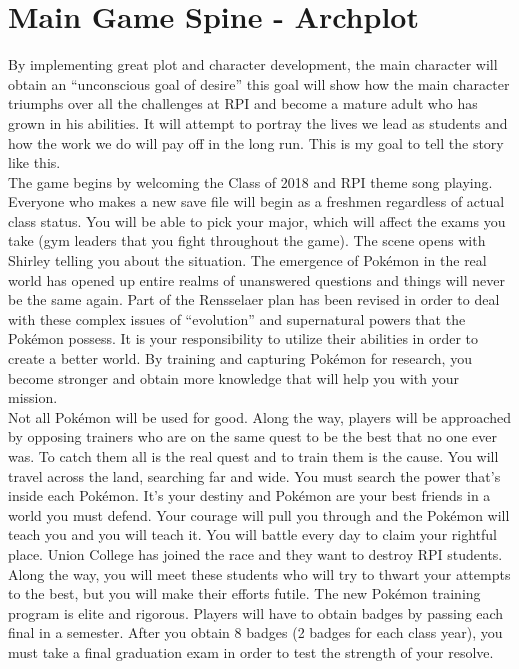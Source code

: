 \documentclass[11pt,fleqn]{book} %
\begin{document}
\vspace{1em}

\section{Main Game Spine - Archplot}
\vspace{1em}

\indent By implementing great plot and character development, the main character will obtain an “unconscious goal of desire” this goal will show how the main character triumphs over all the challenges at RPI and become a mature adult who has grown in his abilities. It will attempt to portray the lives we lead as students and how the work we do will pay off in the long run. This is my goal to tell the story like this.\\
\indent The game begins by welcoming the Class of 2018 and RPI theme song playing. Everyone who makes a new save file will begin as a freshmen regardless of actual class status. You will be able to pick your major, which will affect the exams you take (gym leaders that you fight throughout the game). The scene opens with Shirley telling you about the situation. The emergence of Pokémon in the real world has opened up entire realms of unanswered questions and things will never be the same again. Part of the Rensselaer plan has been revised in order to deal with these complex issues of “evolution” and supernatural powers that the Pokémon possess. It is your responsibility to utilize their abilities in order to create a better world. By training and capturing Pokémon for research, you become stronger and obtain more knowledge that will help you with your mission.\\
\indent Not all Pokémon will be used for good. Along the way, players will be approached by opposing trainers who are on the same quest to be the best that no one ever was. To catch them all is the real quest and to train them is the cause. You will travel across the land, searching far and wide. You must search the power that’s inside each Pokémon. It’s your destiny and Pokémon are your best friends in a world you must defend. Your courage will pull you through and the Pokémon will teach you and you will teach it. You will battle every day to claim your rightful place. Union College has joined the race and they want to destroy RPI students. Along the way, you will meet these students who will try to thwart your attempts to the best, but you will make their efforts futile.  
The new Pokémon training program is elite and rigorous. Players will have to obtain badges by passing each final in a semester. After you obtain 8 badges (2 badges for each class year), you must take a final graduation exam in order to test the strength of your resolve.
\end{document}
